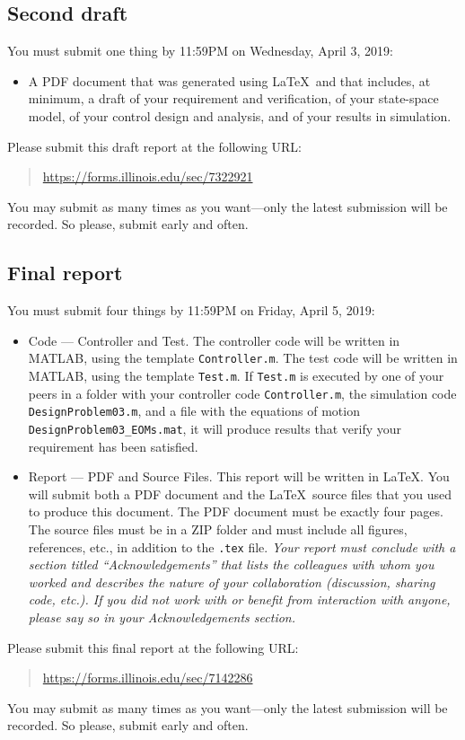 \documentclass[12pt]{article}
\begin{document}
\subsection{Second draft}

You must submit one thing by 11:59PM on Wednesday, April 3, 2019:
\begin{itemize}
\item A PDF document that was generated using \LaTeX\ and that includes, at minimum, a draft of your requirement and verification, of your state-space model, of your control design and analysis, and of your results in simulation.
\end{itemize}
Please submit this draft report at the following URL:
\begin{quote}
\url{https://forms.illinois.edu/sec/7322921}
\end{quote}
You may submit as many times as you want---only the latest submission will be recorded. So please, submit early and often.

\subsection{Final report}

You must submit four things by 11:59PM on Friday, April 5, 2019:
\begin{itemize}

\item Code --- Controller and Test. The controller code will be written in MATLAB, using the template \lstinline!Controller.m!. The test code will be written in MATLAB, using the template \lstinline|Test.m|. If \lstinline|Test.m| is executed by one of your peers in a folder with your controller code \lstinline!Controller.m!, the simulation code \lstinline!DesignProblem03.m!, and a file with the equations of motion \lstinline|DesignProblem03_EOMs.mat|, it will produce results that verify your requirement has been satisfied.

\item Report --- PDF and Source Files. This report will be written in \LaTeX. You will submit both a PDF document and the \LaTeX\ source files that you used to produce this document. The PDF document must be exactly four pages. The source files must be in a ZIP folder and must include all figures, references, etc., in addition to the \lstinline!.tex! file. {\em Your report must conclude with a section titled ``Acknowledgements'' that lists the colleagues with whom you worked and describes the nature of your collaboration (discussion, sharing code, etc.). If you did not work with or benefit from interaction with anyone, please say so in your Acknowledgements section.}

\end{itemize}
Please submit this final report at the following URL:
\begin{quote}
\url{https://forms.illinois.edu/sec/7142286}
\end{quote}
You may submit as many times as you want---only the latest submission will be recorded. So please, submit early and often.
\end{document}
